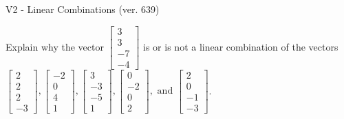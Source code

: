 \begin{exercise}
  \begin{exerciseTitle}V2 - Linear Combinations (ver. 639)\end{exerciseTitle}
  \begin{exerciseStatement}
    Explain why the vector \(\left[\begin{array}{c}
3 \\
3 \\
-7 \\
-4
\end{array}\right]\)  is or is not a linear 
	combination of the vectors \(\left[\begin{array}{c}
2 \\
2 \\
2 \\
-3
\end{array}\right] , \left[\begin{array}{c}
-2 \\
0 \\
4 \\
1
\end{array}\right] , \left[\begin{array}{c}
3 \\
-3 \\
-5 \\
1
\end{array}\right] , \left[\begin{array}{c}
0 \\
-2 \\
0 \\
2
\end{array}\right] , \text{ and } \left[\begin{array}{c}
2 \\
0 \\
-1 \\
-3
\end{array}\right]\).
	



\end{exerciseStatement}
\end{exercise}
